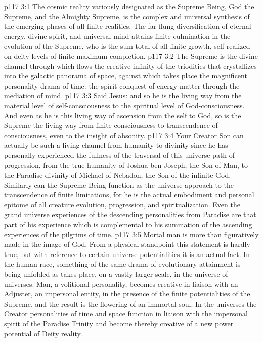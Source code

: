 \vs p117 3:1 The cosmic reality variously designated as the Supreme Being, God the Supreme, and the Almighty Supreme, is the complex and universal synthesis of the emerging phases of all finite realities. The far\hyp{}flung diversification of eternal energy, divine spirit, and universal mind attains finite culmination in the evolution of the Supreme, who is the sum total of all finite growth, self\hyp{}realized on deity levels of finite maximum completion.
\vs p117 3:2 The Supreme is the divine channel through which flows the creative infinity of the triodities that crystallizes into the galactic panorama of space, against which takes place the magnificent personality drama of time: the spirit conquest of energy\hyp{}matter through the mediation of mind.
\vs p117 3:3 \pc Said Jesus:  and so he is the living way from the material level of self\hyp{}consciousness to the spiritual level of God\hyp{}consciousness. And even as he is this living way of ascension from the self to God, so is the Supreme the living way from finite consciousness to transcendence of consciousness, even to the insight of absonity.
\vs p117 3:4 Your Creator Son can actually be such a living channel from humanity to divinity since he has personally experienced the fullness of the traversal of this universe path of progression, from the true humanity of Joshua ben Joseph, the Son of Man, to the Paradise divinity of Michael of Nebadon, the Son of the infinite God. Similarly can the Supreme Being function as the universe approach to the transcendence of finite limitations, for he is the actual embodiment and personal epitome of all creature evolution, progression, and spiritualization. Even the grand universe experiences of the descending personalities from Paradise are that part of his experience which is complemental to his summation of the ascending experiences of the pilgrims of time.
\vs p117 3:5 \pc Mortal man is more than figuratively made in the image of God. From a physical standpoint this statement is hardly true, but with reference to certain universe potentialities it is an actual fact. In the human race, something of the same drama of evolutionary attainment is being unfolded as takes place, on a vastly larger scale, in the universe of universes. Man, a volitional personality, becomes creative in liaison with an Adjuster, an impersonal entity, in the presence of the finite potentialities of the Supreme, and the result is the flowering of an immortal soul. In the universes the Creator personalities of time and space function in liaison with the impersonal spirit of the Paradise Trinity and become thereby creative of a new power potential of Deity reality.
